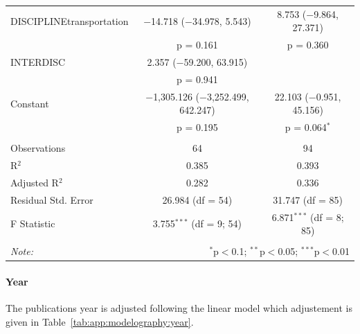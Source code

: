 \documentclass[10pt]{article}
\begin{document}
\begin{table}
\begin{tabular}{@{\extracolsep{5pt}}lcc}
  DISCIPLINEtransportation & $-$14.718 ($-$34.978, 5.543) & 8.753 ($-$9.864, 27.371) \\ 
  & p = 0.161 & p = 0.360 \\ 
  INTERDISC & 2.357 ($-$59.200, 63.915) &  \\ 
  & p = 0.941 &  \\ 
  Constant & $-$1,305.126 ($-$3,252.499, 642.247) & 22.103 ($-$0.951, 45.156) \\ 
  & p = 0.195 & p = 0.064$^{*}$ \\ 
 \hline \\[-1.8ex] 
Observations & 64 & 94 \\ 
R$^{2}$ & 0.385 & 0.393 \\ 
Adjusted R$^{2}$ & 0.282 & 0.336 \\ 
Residual Std. Error & 26.984 (df = 54) & 31.747 (df = 85) \\ 
F Statistic & 3.755$^{***}$ (df = 9; 54) & 6.871$^{***}$ (df = 8; 85) \\ 
\hline 
\hline \\[-1.8ex] 
\textit{Note:}  & \multicolumn{2}{r}{$^{*}$p$<$0.1; $^{**}$p$<$0.05; $^{***}$p$<$0.01} \\ 
\end{tabular} 
\end{table} 


\paragraph{Year}

The publications year is adjusted following the linear model which adjustement is given in Table~\ref{tab:app:modelography:year}.
\end{document}
